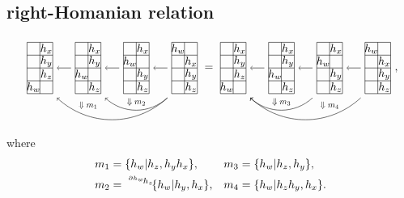 \documentclass[11pt, reqno]{amsart} %
\newcommand{\act}[1]{\,\sp{#1}\!}
\newcommand{\strsquare}[4][]{
  \begin{scope}[every node/.append style={overlay},#1]
    \foreach \x [count=\i] in {#4}{
      \ifx\x\empty
      \else
        \pgfmathsetmacro{\modResult}{mod(\i-1, #2)}
        \pgfmathsetmacro{\quotResult}{(\i-\modResult-1)/#2}
        \node at (\modResult,-\quotResult) {\x};
      \fi
    }
    \foreach \x in {0,1,...,#2}{
      \draw ({-1/2+\x},{1/2})--({-1/2+\x},{-#3+1/2});
    }
    \foreach \y in {0,1,...,#3}{
      \draw ({-1/2},{1/2-\y})--({#2-1/2},{1/2-\y});
    }
  \end{scope}
}
\theoremstyle{definition}
\theoremstyle{remark}
\numberwithin{equation}{section}
\begin{document}
\subsection{right-Homanian relation}
\[
  \begin{tikzpicture}[baseline=-2pt]
    \node (A) at (2.25,0) {\tikz[baseline=-2pt,scale=.4]{\strsquare{2}{4}{$h_w$,,,$h_x$,,$h_y$,,$h_z$}}};
    \node (B) at (.75,0) {\tikz[baseline=-2pt,scale=.4]{\strsquare{2}{4}{,$h_x$,$h_w$,,,$h_y$,,$h_z$}}};
    \node (C) at (-.75,0) {\tikz[baseline=-2pt,scale=.4]{\strsquare{2}{4}{,$h_x$,,$h_y$,$h_w$,,,$h_z$}}};
    \node (D) at (-2.25,0) {\tikz[baseline=-2pt,scale=.4]{\strsquare{2}{4}{,$h_x$,,$h_y$,,$h_z$,$h_w$,}}};
    \draw [->] (A) to (B);
    \draw [->] (B) to (C);
    \draw [->] (C) to (D);
    \draw [->,bend left=1.5cm] (A.south west) to (D.south east);
    \draw [->,bend left=1.5cm] (A.south west) to node (D) {} (C.south east);
    \path (B.north) to [pos=15/16] coordinate (A) (B.south);
    \path (B) to node [transform shape,scale=.75] {$\Downarrow m_2$} (D);
    \path (C.north) to [pos=5/4] coordinate (D) (C.south);
    \path (C) to node [transform shape,scale=.75] {$\Downarrow m_1$} (D);
  \end{tikzpicture}
  =
  \begin{tikzpicture}[baseline=-2pt]
    \node (A) at (2.25,0) {\tikz[baseline=-2pt,scale=.4]{\strsquare{2}{4}{$h_w$,,,$h_x$,,$h_y$,,$h_z$}}};
    \node (B) at (.75,0) {\tikz[baseline=-2pt,scale=.4]{\strsquare{2}{4}{,$h_x$,$h_w$,,,$h_y$,,$h_z$}}};
    \node (C) at (-.75,0) {\tikz[baseline=-2pt,scale=.4]{\strsquare{2}{4}{,$h_x$,,$h_y$,$h_w$,,,$h_z$}}};
    \node (D) at (-2.25,0) {\tikz[baseline=-2pt,scale=.4]{\strsquare{2}{4}{,$h_x$,,$h_y$,,$h_z$,$h_w$,}}};
    \draw [->] (A) to (B);
    \draw [->] (B) to (C);
    \draw [->] (C) to (D);
    \draw [->,bend left=1.5cm] (A.south west) to (D.south east);
    \draw [->,bend left=1.5cm] (B.south west) to node (A) {} (D.south east);
    \path (C) to node [transform shape,scale=.75] {$\Downarrow m_3$} (A);
    \path (B.north) to [pos=5/4] coordinate (D) (B.south);
    \path (B) to node [transform shape,scale=.75] {$\Downarrow m_4$} (D);
  \end{tikzpicture},
\]
where
\begin{align}
  \nonumber
  m_1 &= \{h_w|h_z,h_yh_x\}, &
  m_3 &= \{h_w|h_z,h_y\}, \\
  \nonumber
  m_2 &= \act{\act{\partial h_w}h_z}\{h_w|h_y,h_x\}, &
  m_4 &= \{h_w|h_zh_y,h_x\}.
\end{align}
\end{document}
